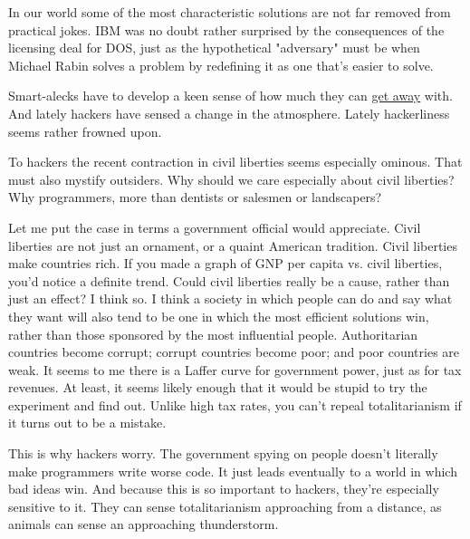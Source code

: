 In our world some of the most
                  characteristic solutions are not far removed from practical
                  jokes. IBM was no doubt rather surprised by the consequences
                  of the licensing deal for DOS, just as the hypothetical
                  "adversary" must be when Michael Rabin solves a problem by
                  redefining it as one that's easier to solve.

Smart-alecks
                  have to develop a keen sense of how much they can
                  \href{http://www.paulgraham.com/say.html}{get away} with. And lately hackers have
                  sensed a change in the atmosphere. Lately hackerliness seems
                  rather frowned upon.

To hackers the recent
                  contraction in civil liberties seems especially ominous. That
                  must also mystify outsiders. Why should we care especially
                  about civil liberties? Why programmers, more than dentists or
                  salesmen or landscapers?

Let me put the case in
                  terms a government official would appreciate. Civil liberties
                  are not just an ornament, or a quaint American tradition.
                  Civil liberties make countries rich. If you made a graph of
                  GNP per capita vs. civil liberties, you'd notice a definite
                  trend. Could civil liberties really be a cause, rather than
                  just an effect? I think so. I think a society in which people
                  can do and say what they want will also tend to be one in
                  which the most efficient solutions win, rather than those
                  sponsored by the most influential people. Authoritarian
                  countries become corrupt; corrupt countries become poor; and
                  poor countries are weak. It seems to me there is a Laffer
                  curve for government power, just as for tax revenues. At
                  least, it seems likely enough that it would be stupid to try
                  the experiment and find out. Unlike high tax rates, you can't
                  repeal totalitarianism if it turns out to be a mistake.

This
                  is why hackers worry. The government spying on people doesn't
                  literally make programmers write worse code. It just leads
                  eventually to a world in which bad ideas win. And because this
                  is so important to hackers, they're especially sensitive to
                  it. They can sense totalitarianism approaching from a
                  distance, as animals can sense an approaching thunderstorm.


